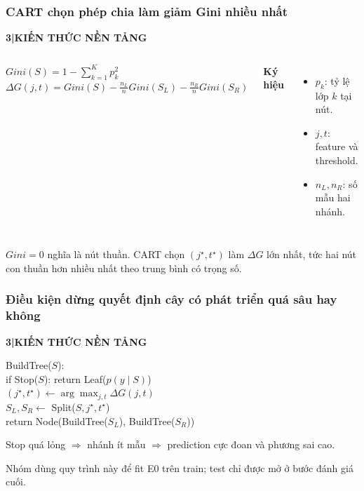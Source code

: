 \documentclass[aspectratio=169,12pt]{beamer}
\newcommand{\chaptertag}[2]{%
  \vspace{-0.16cm}%
  {\scriptsize\bfseries\textcolor{boxframe}{#1\enspace |\enspace #2}}\par
  \vspace{0.12cm}%
}
\begin{document}
\begin{frame}
  \frametitle{CART chọn phép chia làm giảm Gini nhiều nhất}
  \chaptertag{3}{KIẾN THỨC NỀN TẢNG}
  \begin{columns}[T,onlytextwidth]
      \begin{tcolorbox}[focusbox,width=\linewidth,top=3mm,bottom=3mm]
        \centering
        $\displaystyle Gini(S)=1-\sum_{k=1}^{K}p_k^2$\\[0.32cm]
        $\displaystyle \Delta G(j,t)=Gini(S)-\frac{n_L}{n}Gini(S_L)-\frac{n_R}{n}Gini(S_R)$
      \end{tcolorbox}
      \small
      \textbf{Ký hiệu}
      \begin{itemize}
        \item $p_k$: tỷ lệ lớp $k$ tại nút.
        \item $j,t$: feature và threshold.
        \item $n_L,n_R$: số mẫu hai nhánh.
      \end{itemize}
  \end{columns}
  \vspace{0.24cm}
  \small
  $Gini=0$ nghĩa là nút thuần. CART chọn $(j^\star,t^\star)$ làm $\Delta G$ lớn nhất, tức hai nút con thuần hơn nhiều nhất theo trung bình có trọng số.
\end{frame}

\begin{frame}
  \frametitle{Điều kiện dừng quyết định cây có phát triển quá sâu hay không}
  \chaptertag{3}{KIẾN THỨC NỀN TẢNG}
  \begin{tcolorbox}[focusbox,width=0.84\textwidth,top=3mm,bottom=3mm]
    {\small\ttfamily
    BuildTree($S$):\\
    \quad if Stop($S$): return Leaf($\hat p(y\mid S)$)\\
    \quad $(j^\star,t^\star)\leftarrow\arg\max_{j,t}\Delta G(j,t)$\\
    \quad $S_L,S_R\leftarrow$ Split($S,j^\star,t^\star$)\\
    \quad return Node(BuildTree($S_L$), BuildTree($S_R$))}
  \end{tcolorbox}
  \vspace{0.28cm}
  \begin{tcolorbox}[riskbox,width=0.88\textwidth,top=2mm,bottom=2mm]
    \centering
    Stop quá lỏng $\Rightarrow$ nhánh ít mẫu $\Rightarrow$ prediction cực đoan và phương sai cao.
  \end{tcolorbox}
  \vspace{0.16cm}
  \centering
  \small Nhóm dùng quy trình này để fit E0 trên train; test chỉ được mở ở bước đánh giá cuối.
\end{frame}
\end{document}
